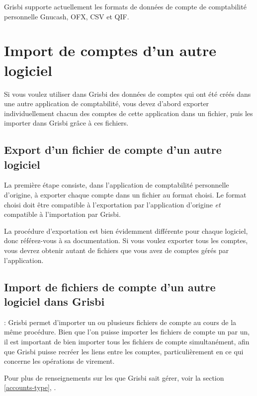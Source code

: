 Grisbi supporte actuellement les formats de données de compte de comptabilité personnelle \gls{Gnucash}, \gls{OFX}, \gls{CSV} et \gls{QIF}.


\section{Import de comptes d'un autre logiciel\label{move-import}}


Si vous voulez utiliser dans Grisbi des données de comptes qui ont été créés
dans une autre application de comptabilité, vous devez d'abord exporter individuellement chacun des comptes de cette application dans un fichier, puis les importer dans Grisbi grâce à ces fichiers.


\subsection{Export d'un fichier de compte d'un autre logiciel\label{move-import-exportinit}}

La première étape consiste, dans l'application de comptabilité personnelle
d'origine, à exporter chaque compte dans un fichier au format choisi. Le format choisi doit être compatible à l'exportation par l'application d'origine \emph{et} compatible à l'importation par Grisbi.

La procédure d'exportation est bien évidemment différente pour chaque logiciel, donc référez-vous à sa documentation. Si vous voulez exporter tous les comptes, vous devrez obtenir autant de fichiers que vous avez de comptes gérés par l'application.


\subsection{Import de fichiers de compte d'un autre logiciel dans Grisbi\label{move-import-importinit}}

\Note{}: Grisbi permet d'importer un ou plusieurs fichiers de compte au cours de la même procédure. Bien que l'on puisse importer les fichiers de compte un par un, il est important de bien importer tous les fichiers de compte simultanément, afin que Grisbi puisse recréer les liens entre les comptes, particulièrement en ce qui concerne les opérations de virement.

Pour plus de renseignements sur les  que Grisbi sait gérer,  voir la section \vref{accounts-type}, .

